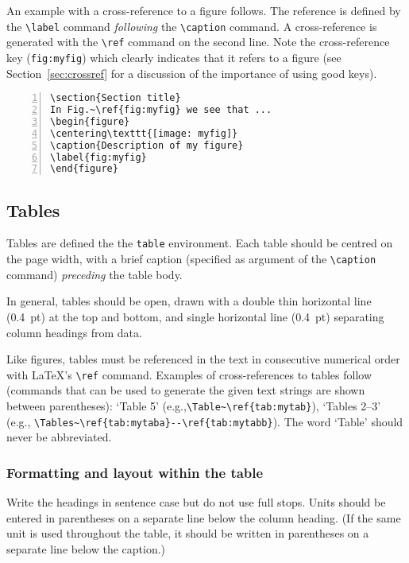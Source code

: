 \documentclass{cernphprep}
\providecommand*\eg{e.g.,\xspace}
\begin{document}
An example with a cross-reference to a figure follows. The reference
is defined by the \verb!\label! command \emph{following} the
\verb!\caption! command. A cross-reference is generated with the
\verb!\ref! command on the second line. Note the cross-reference key
(\texttt{fig:myfig}) which clearly indicates that it refers to a
figure (see Section~\ref{sec:crossref} for a discussion of the importance of
using good keys).
\begin{Verbatim}[numbers=left,fontsize=\small]
\section{Section title}
In Fig.~\ref{fig:myfig} we see that ...
\begin{figure}
\centering\texttt{[image: myfig]}
\caption{Description of my figure}
\label{fig:myfig}
\end{figure}
\end{Verbatim}

\subsection{Tables}

Tables are defined the the \texttt{table} environment.  Each table
should be centred on the page width, with a brief caption (specified
as argument of the \verb!\caption! command) \emph{preceding} the table
body.

In general, tables should be open, drawn with a double thin horizontal
line (0.4~pt) at the top and bottom, and single horizontal line
(0.4~pt) separating column headings from data.

Like figures, tables must be referenced in the text in consecutive
numerical order with \LaTeX's \verb!\ref! command. Examples of
cross-references to tables follow (commands that can be used to
generate the given text strings are shown between parentheses): `Table
5' (\eg \verb!\Table~\ref{tab:mytab}!),
`Tables 2--3' (\eg
\verb!\Tables~\ref{tab:mytaba}--\ref{tab:mytabb}!). The word `Table'
should never be abbreviated.

\subsubsection{Formatting and layout within the table}

Write the headings in sentence case but do not use full stops. Units
should be entered in parentheses on a separate line below the column
heading. (If the same unit is used throughout the table, it should be
written in parentheses on a separate line below the caption.)
\end{document}
